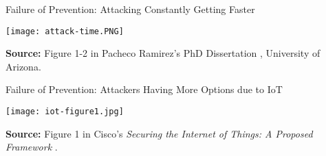 \documentclass[aspectratio=169]{beamer} %
\begin{document}
\begin{frame}{Failure of Prevention: Attacking Constantly Getting Faster}
	\centering 
	
	\vspace{0.25\baselineskip}
	
	\texttt{[image: attack-time.PNG]}
	
	\EndofPage
	
	\centering \scriptsize{\textbf{Source:} Figure 1-2 in Pacheco Ramirez's PhD Dissertation \cite{pacheco2017anomaly}, University of Arizona.}
	
	\vspace{0.5\baselineskip}
\end{frame}

\begin{frame}{Failure of Prevention: Attackers Having More Options due to IoT}
	\centering 
	
	\vspace{0.25\baselineskip}
	
	\texttt{[image: iot-figure1.jpg]}
	
	\EndofPage
	
	\centering \scriptsize{\textbf{Source:} Figure 1 in Cisco's \textit{Securing the Internet of Things: A Proposed Framework} \cite{pacheco2017anomaly}.}
	
	\vspace{0.5\baselineskip}
\end{frame}
\end{document}
